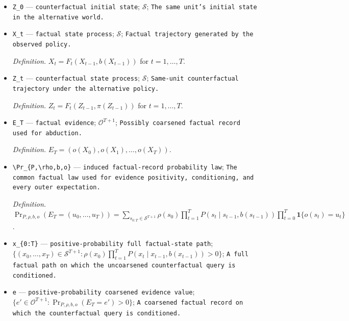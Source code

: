 \documentclass{article}
\begin{document}
\begin{itemize}
  \par\smallskip\noindent\emph{Definition.} \(X_0\sim\rho\).
  \item \texttt{Z\_\allowbreak{}0} --- \texttt{counterfactual initial state}; \(\mathcal S\); \texttt{The same unit's initial state in the alternative world.}
  \item \texttt{X\_\allowbreak{}t} --- \texttt{factual state process}; \(\mathcal S\); \texttt{Factual trajectory generated by the observed policy.}
  \par\smallskip\noindent\emph{Definition.} \(X_t=F_t(X_{t-1},b(X_{t-1}))\) for \(t=1,\ldots,T\).
  \item \texttt{Z\_\allowbreak{}t} --- \texttt{counterfactual state process}; \(\mathcal S\); \texttt{Same-\allowbreak{}unit counterfactual trajectory under the alternative policy.}
  \par\smallskip\noindent\emph{Definition.} \(Z_t=F_t(Z_{t-1},\pi(Z_{t-1}))\) for \(t=1,\ldots,T\).
  \item \texttt{E\_\allowbreak{}T} --- \texttt{factual evidence}; \(\mathcal O^{T+1}\); \texttt{Possibly coarsened factual record used for abduction.}
  \par\smallskip\noindent\emph{Definition.} \(E_T=(o(X_0),o(X_1),\ldots,o(X_T))\).
  \item \texttt{\textbackslash{}\allowbreak{}Pr\_\allowbreak{}\{P,\allowbreak{}\textbackslash{}\allowbreak{}rho,\allowbreak{}b,\allowbreak{}o\}\allowbreak{}} --- \texttt{induced factual-\allowbreak{}record probability law}; \texttt{The common factual law used for evidence positivity,\allowbreak{} conditioning,\allowbreak{} and every outer expectation.}
  \par\smallskip\noindent\emph{Definition.} \(\Pr_{P,\rho,b,o}(E_T=(u_0,\ldots,u_T))=\sum_{s_{0:T}\in\mathcal S^{T+1}}\rho(s_0)\prod_{t=1}^T P(s_t\mid s_{t-1},b(s_{t-1}))\prod_{t=0}^T\mathbf 1\{o(s_t)=u_t\}\).
  \item \texttt{x\_\allowbreak{}\{0:\allowbreak{}T\}\allowbreak{}} --- \texttt{positive-\allowbreak{}probability full factual-\allowbreak{}state path}; \(\{(x_0,\ldots,x_T)\in\mathcal S^{T+1}:\rho(x_0)\prod_{t=1}^T P(x_t\mid x_{t-1},b(x_{t-1}))>0\}\); \texttt{A full factual path on which the uncoarsened counterfactual query is conditioned.}
  \item \texttt{e} --- \texttt{positive-\allowbreak{}probability coarsened evidence value}; \(\{e'\in\mathcal O^{T+1}:\Pr_{P,\rho,b,o}(E_T=e')>0\}\); \texttt{A coarsened factual record on which the counterfactual query is conditioned.}

\end{itemize}
\end{document}
